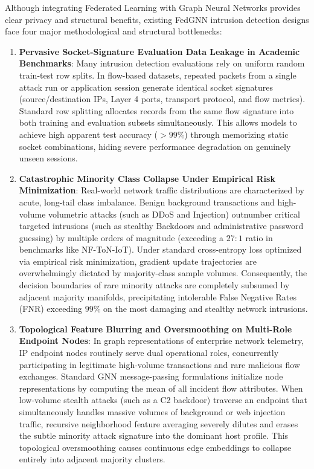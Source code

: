 \documentclass[12pt,a4paper]{report}
\begin{document}
Although integrating Federated Learning with Graph Neural Networks provides clear privacy and structural benefits, existing FedGNN intrusion detection designs face four major methodological and structural bottlenecks:
\begin{enumerate}
    \item \textbf{Pervasive Socket-Signature Evaluation Data Leakage in Academic Benchmarks}: Many intrusion detection evaluations rely on uniform random train-test row splits. In flow-based datasets, repeated packets from a single attack run or application session generate identical socket signatures (source/destination IPs, Layer 4 ports, transport protocol, and flow metrics). Standard row splitting allocates records from the same flow signature into both training and evaluation subsets simultaneously. This allows models to achieve high apparent test accuracy ($>99\%$) through memorizing static socket combinations, hiding severe performance degradation on genuinely unseen sessions.
    \item \textbf{Catastrophic Minority Class Collapse Under Empirical Risk Minimization}: Real-world network traffic distributions are characterized by acute, long-tail class imbalance. Benign background transactions and high-volume volumetric attacks (such as DDoS and Injection) outnumber critical targeted intrusions (such as stealthy Backdoors and administrative password guessing) by multiple orders of magnitude (exceeding a $27:1$ ratio in benchmarks like NF-ToN-IoT). Under standard cross-entropy loss optimized via empirical risk minimization, gradient update trajectories are overwhelmingly dictated by majority-class sample volumes. Consequently, the decision boundaries of rare minority attacks are completely subsumed by adjacent majority manifolds, precipitating intolerable False Negative Rates (FNR) exceeding $99\%$ on the most damaging and stealthy network intrusions.
    \item \textbf{Topological Feature Blurring and Oversmoothing on Multi-Role Endpoint Nodes}: In graph representations of enterprise network telemetry, IP endpoint nodes routinely serve dual operational roles, concurrently participating in legitimate high-volume transactions and rare malicious flow exchanges. Standard GNN message-passing formulations initialize node representations by computing the mean of all incident flow attributes. When low-volume stealth attacks (such as a C2 backdoor) traverse an endpoint that simultaneously handles massive volumes of background or web injection traffic, recursive neighborhood feature averaging severely dilutes and erases the subtle minority attack signature into the dominant host profile. This topological oversmoothing causes continuous edge embeddings to collapse entirely into adjacent majority clusters.

\end{enumerate}
\end{document}
